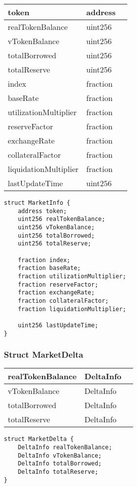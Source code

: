 \ifsoltables
\noindent\begin{tabular}{|l|l|p{6cm}|}\hline
token & address & \\\hline
realTokenBalance & uint256 & \\\hline
vTokenBalance & uint256 & \\\hline
totalBorrowed & uint256 & \\\hline
totalReserve & uint256 & \\\hline
index & fraction & \\\hline
baseRate & fraction & \\\hline
utilizationMultiplier & fraction & \\\hline
reserveFactor & fraction & \\\hline
exchangeRate & fraction & \\\hline
collateralFactor & fraction & \\\hline
liquidationMultiplier & fraction & \\\hline
lastUpdateTime & uint256 & \\\hline
\end{tabular}
\fi


\begin{lstlisting}[firstnumber=10]
struct MarketInfo {
    address token;
    uint256 realTokenBalance;
    uint256 vTokenBalance;
    uint256 totalBorrowed;
    uint256 totalReserve;

    fraction index;
    fraction baseRate;
    fraction utilizationMultiplier;
    fraction reserveFactor;
    fraction exchangeRate;
    fraction collateralFactor;
    fraction liquidationMultiplier;

    uint256 lastUpdateTime;
}
\end{lstlisting}

\subsubsection{Struct MarketDelta}


\ifsoltables
\noindent\begin{tabular}{|l|l|p{6cm}|}\hline
realTokenBalance & DeltaInfo & \\\hline
vTokenBalance & DeltaInfo & \\\hline
totalBorrowed & DeltaInfo & \\\hline
totalReserve & DeltaInfo & \\\hline
\end{tabular}
\fi


\begin{lstlisting}[firstnumber=28]
struct MarketDelta {
    DeltaInfo realTokenBalance;
    DeltaInfo vTokenBalance;
    DeltaInfo totalBorrowed;
    DeltaInfo totalReserve;
}
\end{lstlisting}

